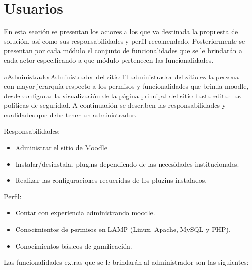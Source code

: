 \section{Usuarios}
\label{analisis:usuarios}

 En esta sección se presentan los actores a los que va destinada la propuesta de
 solución, así como sus responsabilidades y perfil recomendado. Posteriormente se
 presentan por cada módulo el conjunto de funcionalidades que se le brindarán a
 cada actor especificando a que módulo pertenecen las funcionalidades.


    \begin{actor}{aAdministrador}{Administrador del sitio}{%
    El administrador del sitio es la persona con mayor jerarquía respecto a los
    permisos y funcionalidades que brinda moodle, desde configurar la visualización
    de la página principal del sitio hasta editar las políticas de seguridad. A
    continuación se describen las responsabilidades y cualidades que debe tener
    un administrador.}

    \item[Responsabilidades:] \hfill
        \begin{itemize}
        \item Administrar el sitio de Moodle.
        \item Instalar/desinstalar plugins dependiendo de las necesidades
              institucionales.
        \item Realizar las configuraciones requeridas de los plugins instalados.
        \end{itemize}

    \item[Perfil:] \hfill
        \begin{itemize}
        \item Contar con experiencia administrando moodle.
        \item Conocimientos de permisos en LAMP (Linux, Apache, MySQL y PHP).
        \item Conocimientos básicos de gamificación.\\
        \end{itemize}
    \end{actor}

    \noindent
    Las funcionalidades extras que se le brindarán al administrador son las
    siguientes:

